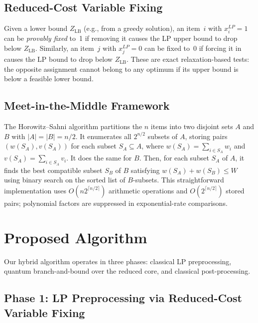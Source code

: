 \documentclass[pdflatex,sn-mathphys-num]{sn-jnl}
\begin{document}
\subsection{Reduced-Cost Variable Fixing}

Given a lower bound $Z_{\text{LB}}$ (e.g., from a greedy solution), an item~$i$ with $x_i^{LP} = 1$ can be \textit{provably fixed} to~1 if removing it causes the LP upper bound to drop below $Z_{\text{LB}}$. Similarly, an item~$j$ with $x_j^{LP} = 0$ can be fixed to~0 if forcing it in causes the LP bound to drop below $Z_{\text{LB}}$. These are exact relaxation-based tests: the opposite assignment cannot belong to any optimum if its upper bound is below a feasible lower bound.

\subsection{Meet-in-the-Middle Framework}

The Horowitz--Sahni algorithm \cite{ref2} partitions the $n$ items into two disjoint sets $A$ and $B$ with $|A| = |B| = n/2$. It enumerates all $2^{n/2}$ subsets of $A$, storing pairs $(w(S_A), v(S_A))$ for each subset $S_A \subseteq A$, where $w(S_A) = \sum_{i \in S_A} w_i$ and $v(S_A) = \sum_{i \in S_A} v_i$. It does the same for $B$. Then, for each subset $S_A$ of $A$, it finds the best compatible subset $S_B$ of $B$ satisfying $w(S_A) + w(S_B) \leq W$ using binary search on the sorted list of $B$-subsets. This straightforward implementation uses $O(n2^{\lceil n/2\rceil})$ arithmetic operations and $O(2^{\lceil n/2\rceil})$ stored pairs; polynomial factors are suppressed in exponential-rate comparisons.

\section{Proposed Algorithm}

Our hybrid algorithm operates in three phases: classical LP preprocessing, quantum branch-and-bound over the reduced core, and classical post-processing.

\subsection{Phase 1: LP Preprocessing via Reduced-Cost Variable Fixing}
\end{document}

